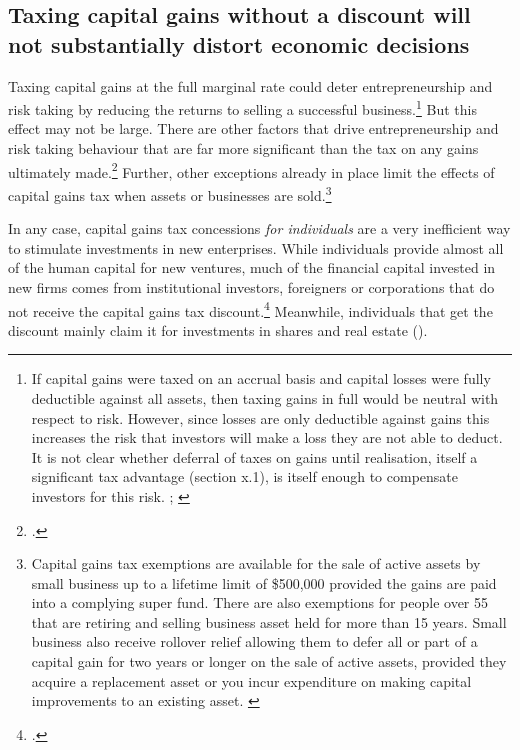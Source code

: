 \documentclass{grattan}\usepackage[]{graphicx}\usepackage[]{color}
\begin{document}
\subsection{Taxing capital gains without a discount will not substantially distort economic decisions}
Taxing capital gains at the full marginal rate could deter entrepreneurship and risk taking by reducing the returns to selling a successful business.\footnote{If capital gains were taxed on an accrual basis and capital losses were fully deductible against all assets, then taxing gains in full would be neutral with respect to risk. However, since losses are only deductible against gains this increases the risk that investors will make a loss they are not able to deduct. It is not clear whether deferral of taxes on gains until realisation, itself a significant tax advantage (section x.1), is itself enough to compensate investors for this risk. \textcite[p.~8]{Burman2009};  \textcite[p.~130]{Commission2004}}  But this effect may not be large. There are other factors that drive entrepreneurship and risk taking behaviour that are far more significant than the tax on any gains ultimately made.\footcite[p.~75]{Burman1999}   Further, other exceptions already in place limit the effects of capital gains tax when assets or businesses are sold.\footnote{Capital gains tax exemptions are available for the sale of active assets by small business up to a lifetime limit of \$500,000 provided the gains are paid into a complying super fund. There are also exemptions for people over 55 that are retiring and selling business asset held for more than 15 years. Small business also receive rollover relief allowing them to defer all or part of a capital gain for two years or longer on the sale of active assets, provided they acquire a replacement asset or you incur expenditure on making capital improvements to an existing asset. \textcite{ATO2014e}}

In any case, capital gains tax concessions \emph{for individuals} are a very inefficient way to stimulate investments in new enterprises. While individuals provide almost all of the human capital for new ventures, much of the financial capital invested in new firms comes from institutional investors, foreigners or corporations that do not receive the capital gains tax discount.\footcite{Burman1999}  Meanwhile, individuals that get the discount mainly claim it for investments in shares and real estate (). 
\end{document}
